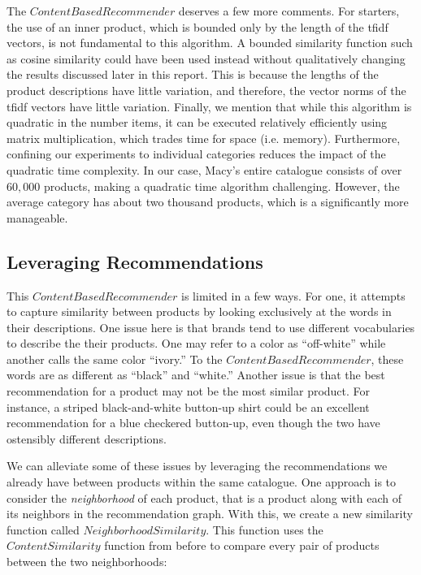 \documentclass[11pt]{article}
\begin{document}
The $ContentBasedRecommender$ deserves a few more comments. For starters, the
use of an inner product, which is bounded only by the length of the tfidf
vectors, is not fundamental to this algorithm. A bounded similarity function
such as cosine similarity could have been used instead without qualitatively
changing the results discussed later in this report. This is because the lengths
of the product descriptions have little variation, and therefore, the vector
norms of the tfidf vectors have little variation. Finally, we mention that while
this algorithm is quadratic in the number items, it can be executed relatively
efficiently using matrix multiplication, which trades time for space (i.e.
memory). Furthermore, confining our experiments to individual categories reduces
the impact of the quadratic time complexity. In our case, Macy's entire
catalogue consists of over $60,000$ products, making a quadratic time algorithm
challenging. However, the average category has about two thousand products,
which is a significantly more manageable.

\subsection*{Leveraging Recommendations}
This $ContentBased Recommender$ is limited in a few ways. For one, it attempts
to capture similarity between products by looking exclusively at the words in
their descriptions. One issue here is that brands tend to use different 
vocabularies to describe the their products. One may refer to a color as 
``off-white'' while another calls the same color ``ivory.'' To the $ContentBased
Recommender$, these words are as different as ``black'' and ``white.'' Another 
issue is that the best recommendation for a product may not be the most similar
product. For instance, a striped black-and-white button-up shirt could be 
an excellent recommendation for a blue checkered button-up, even though the two 
have ostensibly different descriptions.

We can alleviate some of these issues by leveraging the recommendations we
already have between products within the same catalogue. One approach is to 
consider the {\em neighborhood} of each product, that is a product along 
with each of its neighbors in the recommendation graph. With this, we create a
new similarity function called $NeighborhoodSimilarity$. This function uses the 
$ContentSimilarity$ function from before to compare every pair of products 
between the two neighborhoods:
\end{document}

